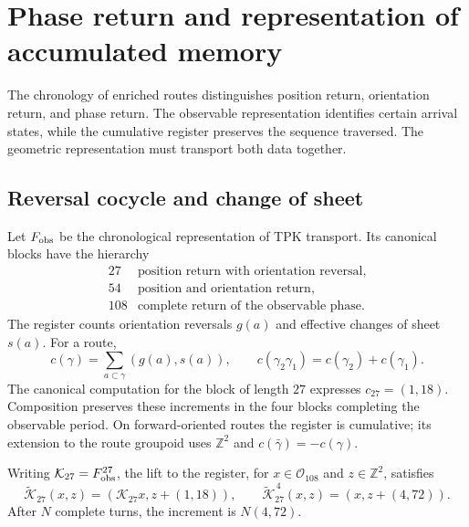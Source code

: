 
\section{Phase return and representation of accumulated memory}
\label{vii:sec:retorno-memoria-gravedad}

The chronology of enriched routes distinguishes position return,
orientation return, and phase return. The observable representation
identifies certain arrival states, while the cumulative register
preserves the sequence traversed. The geometric representation must
transport both data together.

\subsection{Reversal cocycle and change of sheet}
\label{vii:subsec:cociclo-memoria}

Let \(F_{\rm obs}\) be the chronological representation of TPK transport.
Its canonical blocks have the hierarchy
\[
\begin{array}{c|l}
27&\text{position return with orientation reversal},\\
54&\text{position and orientation return},\\
108&\text{complete return of the observable phase}.
\end{array}
\]
The register counts orientation reversals \(g(a)\) and
effective changes of sheet \(s(a)\). For a route,
\begin{equation}
 c(\gamma)=\sum_{a\subset\gamma}(g(a),s(a)),\qquad
 c(\gamma_2\gamma_1)=c(\gamma_2)+c(\gamma_1).
 \label{vii:eq:cociclo-ruta}
\end{equation}
The canonical computation for the block of length \(27\) expresses
\(c_{27}=(1,18)\). Composition preserves these increments in
the four blocks completing the observable period.
On forward-oriented routes the register is cumulative;
its extension to the route groupoid uses \(\mathbb Z^2\) and
\(c(\bar\gamma)=-c(\gamma)\).

\begin{proposition}
\label{vii:prop:memoria-vuelta-completa}
Writing \(\mathcal K_{27}=F_{\rm obs}^{27}\), the lift
to the register, for \(x\in\mathcal O_{108}\) and \(z\in\mathbb Z^2\), satisfies
\[
 \widetilde{\mathcal K}_{27}(x,z)
   =(\mathcal K_{27}x,z+(1,18)),\qquad
 \widetilde{\mathcal K}_{27}^{\,4}(x,z)
   =(x,z+(4,72)).
\]
After \(N\) complete turns, the increment is \(N(4,72)\).
\end{proposition}


